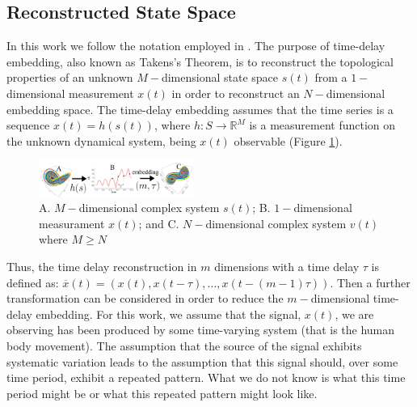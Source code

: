 \documentclass{sigchi}
\begin{document}
\subsection{Reconstructed State Space}
In this work we follow the notation employed in \cite{Uzal2011}.
The purpose of time-delay embedding, also known as Takens's Theorem,
is to reconstruct the topological properties of an unknown $M-$dimensional
state space $s(t)$ from a $1-$dimensional measurement $x(t)$ in order to
reconstruct an $N-$dimensional embedding space.
The time-delay embedding assumes that the time series is a sequence $x(t)=h(s(t))$,
where $h: S \rightarrow \mathbb{R}^M$ is a measurement function on the unknown
dynamical system, being $x(t)$ observable (Figure \ref{fig:takens_theorem}).
\begin{figure}[!htb]
\centering
\includegraphics[width=0.45\textwidth]{figures/reconstructed_state_space/fig}
\caption[PA]{A. $M-$dimensional complex system $s(t)$; B. $1-$dimensional measurament
$x(t)$; and  C. $N-$dimensional complex system $v(t)$ where $M \geq N $}
\label{fig:takens_theorem}
\end{figure}
Thus, the time delay reconstruction in $m$ dimensions with a time delay
$\tau$ is defined as:
$\overline{x}(t) = (x(t), x(t-\tau),...,x(t-(m-1)\tau))$.
Then a further transformation can be considered
in order to reduce
the $m-$dimensional time-delay embedding.
For this work, we assume that the signal, $x(t)$, we are observing has been
produced by some time-varying system (that is the human body movement).
The assumption that the source of the signal exhibits systematic variation
leads to the assumption that this signal should, over some time period,
exhibit a repeated pattern. What we do not know is what this time period might
be or what this repeated pattern might look like.

%
\end{document}
